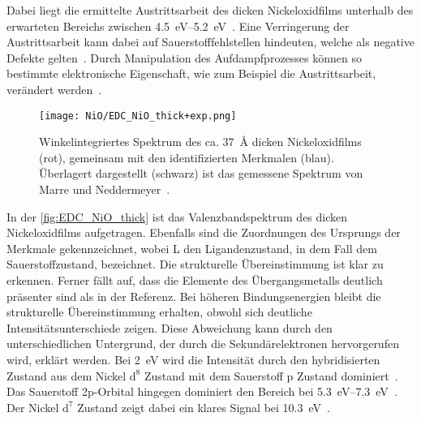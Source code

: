         Dabei liegt die ermittelte Austrittsarbeit des dicken Nickeloxidfilms unterhalb des erwarteten Bereichs zwischen \SIrange[range-phrase=\,und\,]{4.5}{5.2}{\electronvolt}~\cite{poulain_electronic_2020}.
        Eine Verringerung der Austrittsarbeit kann dabei auf Sauerstofffehlstellen hindeuten, welche als negative Defekte gelten~\cite{IF_3}.
        Durch Manipulation des Aufdampfprozesses können so bestimmte elektronische Eigenschaft, wie zum Beispiel die Austrittsarbeit, verändert werden~\cite{poulain_electronic_2020}.

        \begin{figure}
            \centering
            \texttt{[image: NiO/EDC\_NiO\_thick+exp.png]}
            \caption{Winkelintegriertes Spektrum des ca. \SI{37}{\angstrom} dicken Nickeloxidfilms (rot), gemeinsam mit den identifizierten Merkmalen (blau).
            Überlagert dargestellt (schwarz) ist das gemessene Spektrum von Marre und Neddermeyer~\cite{NiO_7}.} 
            \label{fig:EDC_NiO_thick}
        \end{figure}
        In der \autoref{fig:EDC_NiO_thick} ist das Valenzbandspektrum des dicken Nickeloxidfilms aufgetragen.
        Ebenfalls sind die Zuordnungen des Ursprungs der Merkmale gekennzeichnet, wobei L den Ligandenzustand, in dem Fall dem Sauerstoffzustand, bezeichnet.
        Die strukturelle Übereinstimmung ist klar zu erkennen. 
        Ferner fällt auf, dass die Elemente des Übergangsmetalls deutlich präsenter sind als in der Referenz.
        Bei höheren Bindungsenergien bleibt die strukturelle Übereinstimmung erhalten, obwohl sich deutliche Intensitätsunterschiede zeigen.
        Diese Abweichung kann durch den unterschiedlichen Untergrund, der durch die Sekundärelektronen hervorgerufen wird, erklärt werden.
        Bei \SI{2}{\electronvolt} wird die Intensität durch den hybridisierten Zustand aus dem Nickel $\text{d}^8$ Zustand mit dem Sauerstoff p Zustand dominiert~\cite{NiO_13}.
        Das Sauerstoff 2p-Orbital hingegen dominiert den Bereich bei \SIrange[range-phrase=\:und\:]{5.3}{7.3}{\electronvolt}~\cite{NiO_13}.
        Der Nickel $\text{d}^7$ Zustand zeigt dabei ein klares Signal bei \SI{10.3}{\electronvolt}~\cite{NiO_13}.

